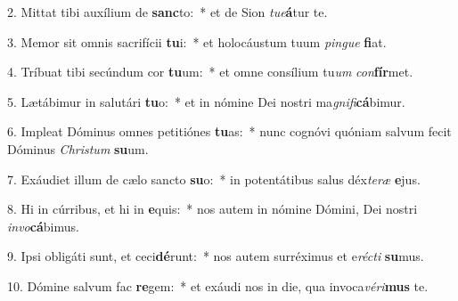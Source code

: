 2. Mittat tibi auxílium de \textbf{sanc}to:~*  et de Sion \textit{tu}\textit{e}\textbf{á}tur te.\

3. Memor sit omnis sacrifícii \textbf{tu}i:~*  et holocáustum tuum \textit{pin}\textit{gue} \textbf{fi}at.\

4. Tríbuat tibi secúndum cor \textbf{tu}um:~*  et omne consílium tu\textit{um} \textit{con}\textbf{fír}met.\

5. Lætábimur in salutári \textbf{tu}o:~*  et in nómine Dei nostri ma\textit{gni}\textit{fi}\textbf{cá}bimur.\

6. Impleat Dóminus omnes petitiónes \textbf{tu}as:~*  nunc cognóvi quóniam salvum fecit Dóminus \textit{Chris}\textit{tum} \textbf{su}um.\

7. Exáudiet illum de cælo sancto \textbf{su}o:~*  in potentátibus salus déx\textit{te}\textit{ræ} \textbf{e}jus.\

8. Hi in cúrribus, et hi in \textbf{e}quis:~*  nos autem in nómine Dómini, Dei nostri \textit{in}\textit{vo}\textbf{cá}bimus.\

9. Ipsi obligáti sunt, et ceci\textbf{dé}runt:~*  nos autem surréximus et e\textit{réc}\textit{ti} \textbf{su}mus.\

10. Dómine salvum fac \textbf{re}gem:~*  et exáudi nos in die, qua invoca\textit{vé}\textit{ri}\textbf{mus} te.\


